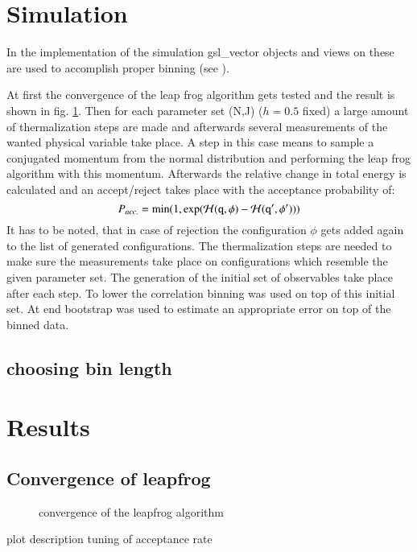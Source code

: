 \documentclass{scrartcl}
\begin{document}
\section{Simulation}
In the implementation of the simulation gsl\_vector objects  and views on these are used to accomplish proper binning (see \cite{gsldoc_mat}). 

At first the convergence of the leap frog algorithm gets tested and the result is shown in fig. \ref{fig:converge}. Then for each parameter set (N,J) ($h=0.5$ fixed) a large amount of thermalization steps are made and afterwards several measurements of the wanted physical variable take place. A step in this case means to sample a conjugated momentum from the normal distribution and performing the leap frog algorithm with this momentum. Afterwards the relative change in total energy is calculated and an accept/reject takes place with the acceptance probability of:
\begin{equation}
	P_{acc.}=\min(1,\exp(\cal{H} (\texttt{q},\phi)-\cal H (\texttt{q}',\phi')))
\end{equation} 
It has to be noted, that in case of rejection the configuration $\phi$ gets added again to the list of generated configurations.
The thermalization steps are needed to make sure the measurements take place on configurations which resemble the given parameter set. The generation of the initial set of observables take place after each step. To lower the correlation binning was used on top of this initial set. At end bootstrap was used to estimate an appropriate error on top of the binned data.

\subsection{choosing bin length}

\section{Results}

\subsection{Convergence of leapfrog}

\begin{figure}[htbp]
	
	\caption{convergence of the leapfrog algorithm}
	\label{fig:converge}
\end{figure}
plot description tuning of acceptance rate
\end{document}
